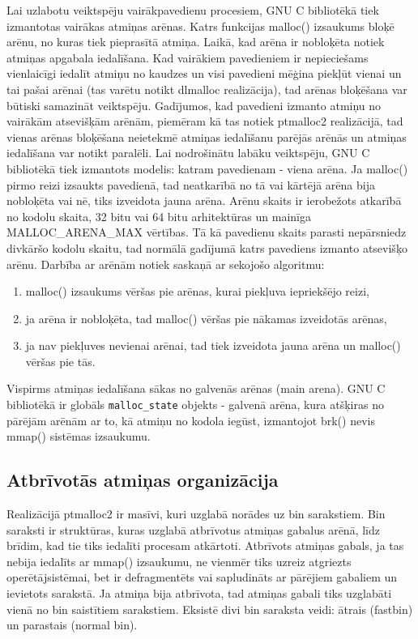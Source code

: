 Lai uzlabotu veiktspēju vairākpavedienu procesiem, GNU C bibliotēkā tiek izmantotas vairākas atmiņas arēnas. 
Katrs funkcijas malloc() izsaukums bloķē arēnu, no kuras tiek pieprasītā atmiņa. 
Laikā, kad arēna ir nobloķēta notiek atmiņas apgabala iedalīšana.
Kad vairākiem pavedieniem ir nepieciešams vienlaicīgi iedalīt atmiņu no kaudzes un visi pavedieni mēģina piekļūt vienai un tai pašai arēnai (tas varētu notikt dlmalloc realizācija), tad arēnas bloķēšana var būtiski samazināt veiktspēju.
Gadījumos, kad pavedieni izmanto atmiņu no vairākām atsevišķām arēnām, piemēram kā tas notiek ptmalloc2 realizācijā, tad vienas arēnas bloķēšana neietekmē atmiņas iedalīšanu parējās arēnās un atmiņas iedalīšana var notikt paralēli.
Lai nodrošinātu labāku veiktspēju, GNU C bibliotēkā tiek izmantots modelis: katram pavedienam - viena arēna. 
Ja malloc() pirmo reizi izsaukts pavedienā, tad neatkarībā no tā vai kārtējā arēna bija nobloķēta vai nē, tiks izveidota jauna arēna.
Arēnu skaits ir ierobežots atkarībā no kodolu skaita, 32 bitu vai 64 bitu arhitektūras un mainīga MALLOC\_ARENA\_MAX vērtības.
Tā kā pavedienu skaits parasti nepārsniedz divkāršo kodolu skaitu, tad normālā gadījumā katrs pavediens izmanto atsevišķo arēnu. 
Darbība ar arēnām notiek saskaņā ar sekojošo algoritmu: 
\begin{enumerate}
\item malloc() izsaukums vēršas pie arēnas, kurai piekļuva iepriekšējo reizi,
\item ja arēna ir nobloķēta, tad malloc() vēršas pie nākamas izveidotās arēnas,
\item ja nav piekļuves nevienai arēnai, tad tiek izveidota jauna arēna un malloc() vēršas pie tās.
\end{enumerate}

Vispirms atmiņas iedalīšana sākas no galvenās arēnas (main arena). 
GNU C bibliotēkā ir globāls \texttt{malloc\_state} objekts - galvenā arēna, kura atšķiras no pārējām arēnām ar to, kā atmiņu no kodola iegūst, izmantojot brk() nevis  mmap() sistēmas izsaukumu. 


 \subsection{Atbrīvotās atmiņas organizācija}
 \label{subsec:bin_saraksti}
Realizācijā ptmalloc2 ir masīvi, kuri uzglabā norādes uz bin sarakstiem.
Bin saraksti ir struktūras, kuras uzglabā atbrīvotus atmiņas gabalus arēnā, līdz brīdim, kad tie tiks iedalīti procesam atkārtoti.
Atbrīvots atmiņas gabals, ja tas nebija iedalīts ar mmap() izsaukumu, ne vienmēr tiks uzreiz atgriezts operētājsistēmai, bet ir defragmentēts vai sapludināts ar pārējiem gabaliem un ievietots sarakstā. 
Ja atmiņa bija atbrīvota, tad atmiņas gabali tiks uzglabāti vienā no bin saistītiem sarakstiem.
Eksistē divi bin saraksta veidi: ātrais (fastbin) un parastais (normal bin).

